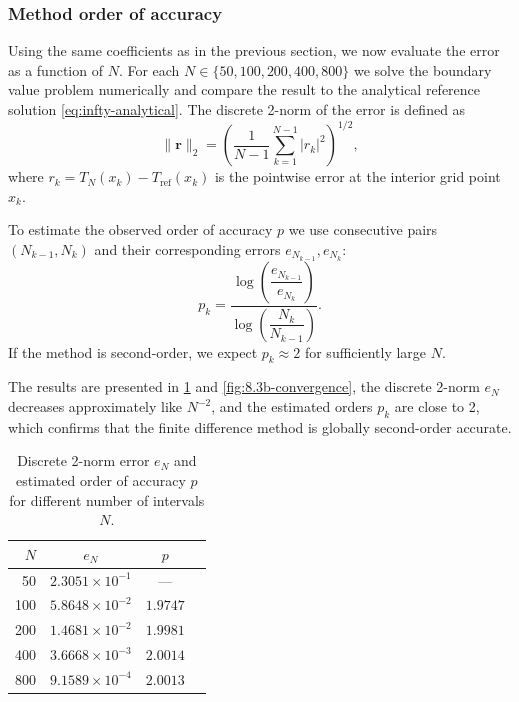 \documentclass[11pt, a4paper]{article}
\theoremstyle{definition}
\begin{document}
\subsubsection{Method order of accuracy}
Using the same coefficients as in the previous section, we now evaluate the error as a function of $N$. For each $N \in \{50, 100, 200, 400, 800\}$ we solve the boundary value problem numerically and compare the result to the analytical reference solution \cref{eq:infty-analytical}. The discrete 2-norm of the error is defined as
\begin{equation}
\label{eq:2-norm-error}
\|\mathbf{r}\|_2
= \left( \frac{1}{N-1} \sum_{k=1}^{N-1} |r_k|^2 \right)^{1/2},
\end{equation}
where $r_k = T_N(x_k) - T_{\mathrm{ref}}(x_k)$ is the pointwise error
at the interior grid point $x_k$.

To estimate the observed order of accuracy $p$ we use consecutive pairs $(N_{k-1}, N_k)$ and their corresponding errors $e_{N_{k-1}}, e_{N_k}$:
\begin{equation}
\label{eq:order-estimate}
p_k
= \frac{\log\!\left( \dfrac{e_{N_{k-1}}}{e_{N_k}} \right)}
       {\log\!\left( \dfrac{N_k}{N_{k-1}} \right)}.
\end{equation}
If the method is second-order, we expect $p_k \approx 2$ for sufficiently large $N$.

The results are presented in \cref{tab:order-accuracy} and \cref{fig:8.3b-convergence}, the discrete 2-norm $e_N$ decreases approximately like $N^{-2}$, and the estimated orders $p_k$ are close to 2, which confirms that the finite difference method is globally second-order accurate.

\begin{table}[h]
\centering
\begin{tabular}{rccc}
\hline
$N$ & $e_N$ & $p$ \\
\hline
 50  & $2.3051\times 10^{-1}$ & ---    \\
100  & $5.8648\times 10^{-2}$ & $1.9747$ \\
200  & $1.4681\times 10^{-2}$ & $1.9981$ \\
400  & $3.6668\times 10^{-3}$ & $2.0014$ \\
800  & $9.1589\times 10^{-4}$ & $2.0013$ \\
\hline
\end{tabular}
\caption{Discrete 2-norm error $e_N$ and estimated order of accuracy $p$ for different number of intervals $N$.}
\label{tab:order-accuracy}
\end{table}
\end{document}
